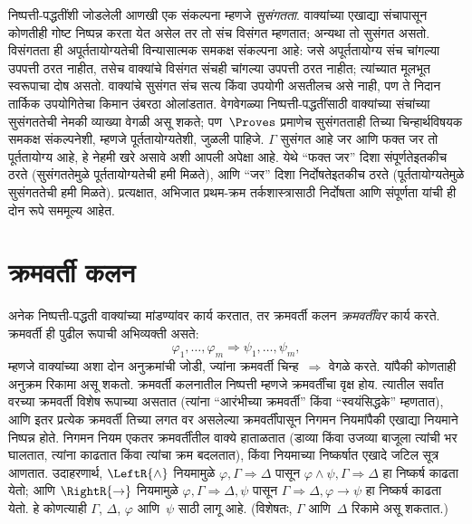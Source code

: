 \documentclass[11pt,a4paper,openany]{book}
\theoremstyle{definition}
\newcommand{\lif}{\mathbin{\to}}
\newcommand{\Sequent}{\Rightarrow}
\begin{document}
निष्पत्ती-पद्धतींशी जोडलेली आणखी एक संकल्पना म्हणजे
\emph{सुसंगतता}. वाक्यांच्या एखाद्या संचापासून कोणतीही गोष्ट
निष्पन्न करता येत असेल तर तो संच विसंगत म्हणतात; अन्यथा तो सुसंगत
असतो. विसंगतता ही अपूर्ततायोग्यतेची विन्यासात्मक समकक्ष संकल्पना आहे:
जसे अपूर्ततायोग्य संच चांगल्या उपपत्ती ठरत नाहीत, तसेच वाक्यांचे
विसंगत संचही चांगल्या उपपत्ती ठरत नाहीत; त्यांच्यात मूलभूत स्वरूपाचा
दोष असतो. वाक्यांचे सुसंगत संच सत्य किंवा उपयोगी असतीलच असे
नाही, पण ते निदान तार्किक उपयोगितेचा किमान उंबरठा ओलांडतात. वेगवेगळ्या
निष्पत्ती-पद्धतींसाठी वाक्यांच्या संचांच्या सुसंगततेची नेमकी
व्याख्या वेगळी असू शकते; पण~$\Proves$ प्रमाणेच सुसंगतताही तिच्या
चिन्हार्थविषयक समकक्ष संकल्पनेशी, म्हणजे पूर्ततायोग्यतेशी, जुळली पाहिजे.
$\Gamma$ सुसंगत आहे जर आणि फक्त जर तो पूर्ततायोग्य आहे, हे नेहमी खरे
असावे अशी आपली अपेक्षा आहे. येथे ``फक्त जर'' दिशा संपूर्णतेइतकीच ठरते
(सुसंगततेमुळे पूर्ततायोग्यतेची हमी मिळते), आणि ``जर'' दिशा
निर्दोषतेइतकीच ठरते (पूर्ततायोग्यतेमुळे सुसंगततेची हमी मिळते).
प्रत्यक्षात, अभिजात प्रथम-क्रम तर्कशास्त्रासाठी निर्दोषता आणि संपूर्णता
यांची ही दोन रूपे सममूल्य आहेत.









\section{क्रमवर्ती कलन}\label{fol:prf:seq:sec}

अनेक निष्पत्ती-पद्धती वाक्यांच्या मांडण्यांवर कार्य करतात,
तर क्रमवर्ती कलन \emph{क्रमवर्तींवर} कार्य करते. क्रमवर्ती ही पुढील रूपाची
अभिव्यक्ती असते:
\[
\varphi_1, \dots, \varphi_m \Sequent \psi_1, \dots, \psi_m,
\]
म्हणजे वाक्यांच्या अशा दोन अनुक्रमांची जोडी, ज्यांना क्रमवर्ती
चिन्ह~$\Sequent$ वेगळे करते. यांपैकी कोणताही अनुक्रम रिकामा असू शकतो.
क्रमवर्ती कलनातील निष्पत्ती म्हणजे क्रमवर्तींचा वृक्ष होय. त्यातील
सर्वांत वरच्या क्रमवर्ती विशेष रूपाच्या असतात (त्यांना ``आरंभीच्या
क्रमवर्ती'' किंवा ``स्वयंसिद्धके'' म्हणतात), आणि इतर प्रत्येक क्रमवर्ती
तिच्या लगत वर असलेल्या क्रमवर्तींपासून निगमन नियमांपैकी एखाद्या नियमाने
निष्पन्न होते. निगमन नियम एकतर क्रमवर्तींतील वाक्ये हाताळतात
(डाव्या किंवा उजव्या बाजूला त्यांची भर घालतात, त्यांना काढतात किंवा त्यांचा क्रम
बदलतात), किंवा नियमाच्या निष्कर्षात एखादे जटिल सूत्र आणतात.
उदाहरणार्थ, $\LeftR{\land}$ नियमामुळे $\varphi, \Gamma \Sequent \Delta$ पासून
$\varphi \land \psi, \Gamma \Sequent \Delta$ हा निष्कर्ष काढता येतो; आणि
$\RightR{\lif}$ नियमामुळे $\varphi, \Gamma \Sequent \Delta, \psi$ पासून
$\Gamma \Sequent \Delta, \varphi \lif \psi$ हा निष्कर्ष काढता येतो. हे कोणत्याही
$\Gamma$, $\Delta$, $\varphi$ आणि~$\psi$ साठी लागू आहे. (विशेषतः, $\Gamma$
आणि~$\Delta$ रिकामे असू शकतात.)
\end{document}
